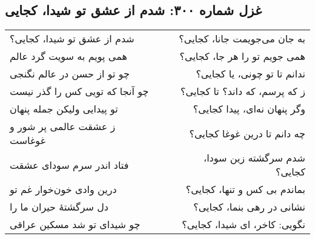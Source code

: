 \begin{center}
\section*{غزل شماره ۳۰۰: شدم از عشق تو شیدا، کجایی}
\label{sec:300}
\begin{longtable}{l p{0.5cm} r}
شدم از عشق تو شیدا، کجایی؟
&&
به جان می‌جویمت جانا، کجایی؟
\\
همی پویم به سویت گرد عالم
&&
همی جویم تو را هر جا، کجایی؟
\\
چو تو از حسن در عالم نگنجی
&&
ندانم تا تو چونی، یا کجایی؟
\\
چو آنجا که تویی کس را گذر نیست
&&
ز که پرسم، که داند؟ تا کجایی؟
\\
تو پیدایی ولیکن جمله پنهان
&&
وگر پنهان نه‌ای، پیدا کجایی؟
\\
ز عشقت عالمی پر شور و غوغاست
&&
چه دانم تا درین غوغا کجایی؟
\\
فتاد اندر سرم سودای عشقت
&&
شدم سرگشته زین سودا، کجایی؟
\\
درین وادی خون‌خوار غم تو
&&
بماندم بی کس و تنها، کجایی؟
\\
دل سرگشتهٔ حیران ما را
&&
نشانی در رهی بنما، کجایی؟
\\
چو شیدای تو شد مسکین عراقی
&&
نگویی: کاخر، ای شیدا، کجایی؟
\\
\end{longtable}
\end{center}
